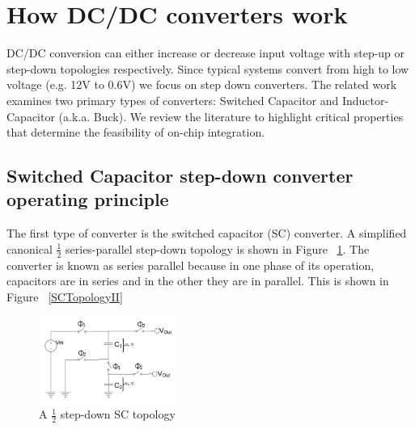 \documentclass[letterpaper,twocolumn,10pt]{article}
\begin{document}
\section{How DC/DC converters work}

DC/DC conversion can either increase or decrease input voltage with step-up or step-down topologies respectively. Since typical systems convert from high to low voltage (e.g. 12V to 0.6V) we focus on step down converters.%
\indent The related work examines two primary types of converters: Switched Capacitor and Inductor-Capacitor (a.k.a. Buck). We review the literature to highlight critical properties that determine the feasibility of on-chip integration.

\subsection{Switched Capacitor step-down converter operating principle}\label{SCOpPrinciple}
The first type of converter is the switched capacitor (SC) converter. A simplified canonical $\frac{1}{2}$ series-parallel step-down topology is shown in Figure ~\ref{SCTopology}. The converter is known as series parallel because in one phase of its operation, capacitors are in series and in the other they are in parallel. This is shown in Figure ~\ref{SCTopologyII}\\


\begin{figure}[here]
\includegraphics[width=0.4\textwidth]{SCTopology}
\caption{A $\frac{1}{2}$ step-down SC topology}
\label{SCTopology}
\end{figure}
\end{document}

